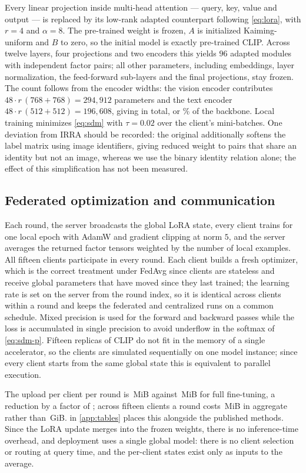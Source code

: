 Every linear projection inside multi-head attention --- query, key, value and output --- is replaced by its low-rank adapted counterpart following \cref{eq:lora}, with $r=4$ and $\alpha=8$. The pre-trained weight is frozen, $A$ is initialized Kaiming-uniform and $B$ to zero, so the initial model is exactly pre-trained CLIP. Across twelve layers, four projections and two encoders this yields $96$ adapted modules with independent factor pairs; all other parameters, including embeddings, layer normalization, the feed-forward sub-layers and the final projections, stay frozen. The count follows from the encoder widths: the vision encoder contributes $48\cdot r\,(768+768)=294{,}912$ parameters and the text encoder $48\cdot r\,(512+512)=196{,}608$, giving \textbf{\numTrainable{}} in total, or \numTrainPct\% of the backbone. Local training minimizes \cref{eq:sdm} with $\tau=0.02$ over the client's mini-batches. One deviation from IRRA should be recorded: the original additionally softens the label matrix using image identifiers, giving reduced weight to pairs that share an identity but not an image, whereas we use the binary identity relation alone; the effect of this simplification has not been measured.

\subsection{Federated optimization and communication}

Each round, the server broadcasts the global LoRA state, every client trains for one local epoch with AdamW and gradient clipping at norm $5$, and the server averages the returned factor tensors weighted by the number of local examples. All fifteen clients participate in every round. Each client builds a fresh optimizer, which is the correct treatment under FedAvg since clients are stateless and receive global parameters that have moved since they last trained; the learning rate is set on the server from the round index, so it is identical across clients within a round and keeps the federated and centralized runs on a common schedule. Mixed precision is used for the forward and backward passes while the loss is accumulated in single precision to avoid underflow in the softmax of \cref{eq:sdm-p}. Fifteen replicas of CLIP do not fit in the memory of a single accelerator, so the clients are simulated sequentially on one model instance; since every client starts from the same global state this is equivalent to parallel execution.

The upload per client per round is \numUplinkLoRA\,MiB against \numUplinkFull\,MiB for full fine-tuning, a reduction by a factor of \numUplinkRatio; across fifteen clients a round costs \numUplinkRoundLoRA\,MiB in aggregate rather than \numUplinkRoundFull\,GiB.  in \cref{app:tables} places this alongside the published methods. Since the LoRA update merges into the frozen weights, there is no inference-time overhead, and deployment uses a single global model: there is no client selection or routing at query time, and the per-client states exist only as inputs to the average.

